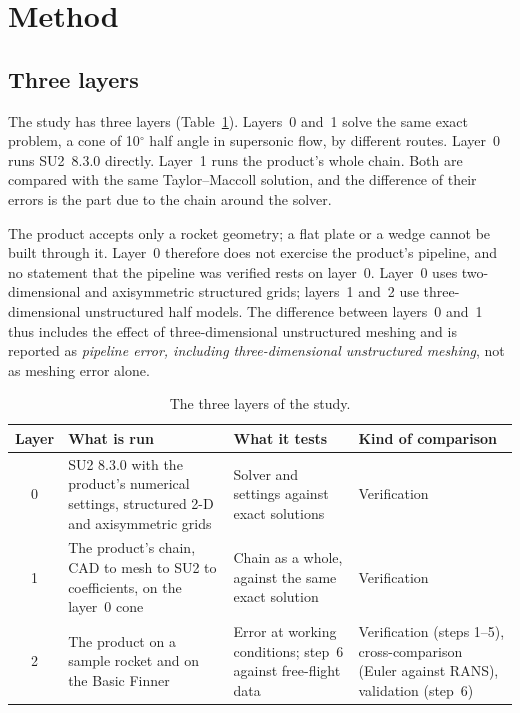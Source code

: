 \documentclass[11pt,a4paper]{article}
\begin{document}
\section{Method}
\label{sec:method}

\subsection{Three layers}
\label{sec:layers}

The study has three layers (Table~\ref{tab:layers}).
Layers~0 and~1 solve the same exact problem, a cone of 10$^\circ$ half angle in supersonic flow, by different
routes.
Layer~0 runs SU2~8.3.0 directly.
Layer~1 runs the product's whole chain.
Both are compared with the same Taylor--Maccoll solution, and the difference of their errors is the part due
to the chain around the solver.

The product accepts only a rocket geometry; a flat plate or a wedge cannot be built through it.
Layer~0 therefore does not exercise the product's pipeline, and no statement that the pipeline was verified
rests on layer~0.
Layer~0 uses two-dimensional and axisymmetric structured grids; layers~1 and~2 use three-dimensional unstructured
half models.
The difference between layers~0 and~1 thus includes the effect of three-dimensional unstructured meshing and
is reported as \emph{pipeline error, including three-dimensional unstructured meshing}, not as meshing error
alone.

\begin{table}[t]
\centering
\caption{The three layers of the study.}
\label{tab:layers}
\small
\begin{tabular}{@{}cp{4.4cm}p{4.2cm}p{3.6cm}@{}}
\toprule
Layer & What is run & What it tests & Kind of comparison \\
\midrule
0 & SU2 8.3.0 with the product's numerical settings, structured 2-D and axisymmetric grids
  & Solver and settings against exact solutions & Verification \\
1 & The product's chain, CAD to mesh to SU2 to coefficients, on the layer~0 cone
  & Chain as a whole, against the same exact solution & Verification \\
2 & The product on a sample rocket and on the Basic Finner
  & Error at working conditions; step~6 against free-flight data
  & Verification (steps 1--5), cross-comparison (Euler against RANS), validation (step~6) \\
\bottomrule
\end{tabular}
\end{table}
\end{document}
